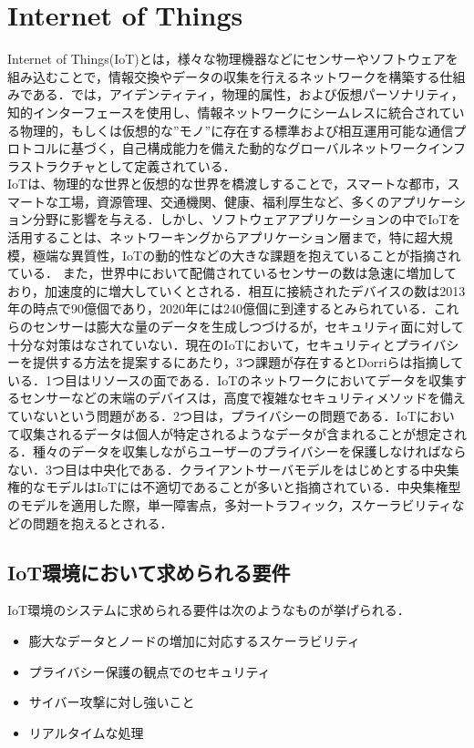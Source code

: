 \documentclass[japanese, macos]{KU2}
\begin{document}
\section{Internet of Things}
Internet of Things(IoT)とは，様々な物理機器などにセンサーやソフトウェアを組み込むことで，情報交換やデータの収集を行えるネットワークを構築する仕組みである．\cite{Vermesan2009}では，アイデンティティ，物理的属性，および仮想パーソナリティ，知的インターフェースを使用し、情報ネットワークにシームレスに統合されている物理的，もしくは仮想的な”モノ”に存在する標準および相互運用可能な通信プロトコルに基づく，自己構成能力を備えた動的なグローバルネットワークインフラストラクチャとして定義されている．\\
IoTは、物理的な世界と仮想的な世界を橋渡しすることで，スマートな都市，スマートな工場，資源管理、交通機関、健康、福利厚生など、多くのアプリケーション分野に影響を与える．しかし、ソフトウェアアプリケーションの中でIoTを活用することは、ネットワーキングからアプリケーション層まで，特に超大規模，極端な異質性，IoTの動的性などの大きな課題を抱えていることが指摘されている\cite{Bouloukakis2016}．
また，世界中において配備されているセンサーの数は急速に増加しており，加速度的に増大していくとされる．相互に接続されたデバイスの数は2013年の時点で90億個であり，2020年には240億個に到達するとみられている\cite{gubbi2013internet}．これらのセンサーは膨大な量のデータを生成しつづけるが，セキュリティ面に対して十分な対策はなされていない．現在のIoTにおいて，セキュリティとプライバシーを提供する方法を提案するにあたり，3つ課題が存在するとDorriら\cite{dorri2017towards}は指摘している．1つ目はリソースの面である．IoTのネットワークにおいてデータを収集するセンサーなどの末端のデバイスは，高度で複雑なセキュリティメソッドを備えていないという問題がある．2つ目は，プライバシーの問題である．IoTにおいて収集されるデータは個人が特定されるようなデータが含まれることが想定される．種々のデータを収集しながらユーザーのプライバシーを保護しなければならない．3つ目は中央化である．クライアントサーバモデルをはじめとする中央集権的なモデルはIoTには不適切であることが多いと指摘されている．中央集権型のモデルを適用した際，単一障害点，多対一トラフィック，スケーラビリティなどの問題を抱えるとされる．\\

\subsection{IoT環境において求められる要件}
IoT環境のシステムに求められる要件は次のようなものが挙げられる．

\begin{itemize}
\item 膨大なデータとノードの増加に対応するスケーラビリティ
\item プライバシー保護の観点でのセキュリティ
\item サイバー攻撃に対し強いこと
\item リアルタイムな処理
\end{itemize}
\end{document}
